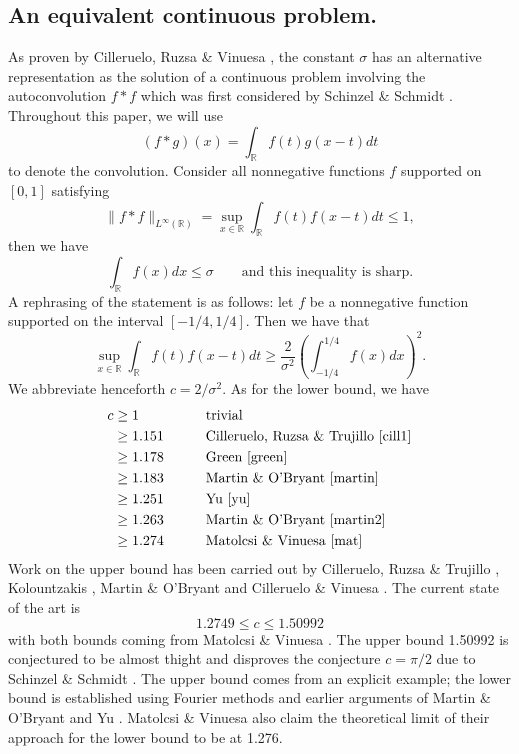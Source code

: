 \documentclass[10pt]{amsart}
\begin{document}
\subsection{An equivalent continuous problem.} As proven by Cilleruelo, Ruzsa \& Vinuesa \cite{cill}, the constant $\sigma$ has an alternative representation as the solution of a continuous problem involving the autoconvolution $f*f$ which was first considered by Schinzel \& Schmidt \cite{sch}. Throughout this paper, we will use
$$ (f*g)(x) = \int_{\mathbb{R}}{f(t)g(x-t)dt}$$
to denote the convolution. Consider all nonnegative functions $f$ supported on $[0,1]$ satisfying
$$\|f*f\|_{L^{\infty}(\mathbb{R})} =  \sup_{x \in \mathbb{R}}{\int_{\mathbb{R}}^{}{f(t)f(x-t)dt}} \leq 1,$$
then we have
$$ \int_{\mathbb{R}}{f(x)dx} \leq \sigma \qquad \mbox{and this inequality is sharp.}$$
A rephrasing of the statement is as follows: let $f$ be a nonnegative
 function supported on the interval $[-1/4, 1/4]$. Then we have that
$$ \sup_{x \in \mathbb{R}}{\int_{\mathbb{R}}{f(t)f(x-t)dt}} \geq \frac{2}{\sigma^2}\left(\int_{-1/4}^{1/4}{f(x)dx} \right)^2.$$
We abbreviate henceforth $c = 2/\sigma^2.$ As for the lower bound,
we have
\begin{align*}
c &\geq 1\qquad &&\mbox{trivial}\\
&\geq 1.151 \qquad &&\mbox{Cilleruelo, Ruzsa \& Trujillo \cite{cill1}} \\
&\geq  1.178 &&\mbox{Green \cite{green}}\\
&\geq  1.183 &&\mbox{Martin \& O'Bryant \cite{martin}}\\
&\geq  1.251 &&\mbox{Yu \cite{yu}}\\
&\geq  1.263 &&\mbox{Martin \& O'Bryant \cite{martin2}}\\
&\geq  1.274 &&\mbox{Matolcsi \& Vinuesa \cite{mat}}
\end{align*}
Work on the upper bound has been
carried out by Cilleruelo, Ruzsa \& Trujillo \cite{cill1}, Kolountzakis \cite{kol}, Martin \& O'Bryant \cite{martin} and Cilleruelo \& Vinuesa \cite{cill2}. 
The current state of the art is
$$ 1.2749 \leq c \leq 1.50992$$
with both bounds coming from Matolcsi \& Vinuesa \cite{mat}. The upper bound 1.50992 is conjectured to be almost thight and disproves the conjecture $c = \pi/2$ 
due to Schinzel \& Schmidt \cite{sch}. The upper bound comes from an explicit example; the lower 
bound is established using Fourier methods and earlier arguments of 
Martin \& O'Bryant \cite{martin3} and Yu \cite{yu}. Matolcsi \& Vinuesa also claim the theoretical limit of their approach for
 the lower bound to be at 1.276. 
\end{document}
